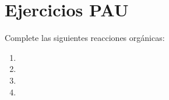 

\section{Ejercicios PAU}

\begin{exerciseEVAU}
    Complete las siguientes reacciones orgánicas:
    \begin{enumerate}[label=\letraminuscula]
        \item {}
        \item {}
        \item {}
        \item {}
    \end{enumerate}
\begin{solu}
    
\end{solu}
\end{exerciseEVAU}

